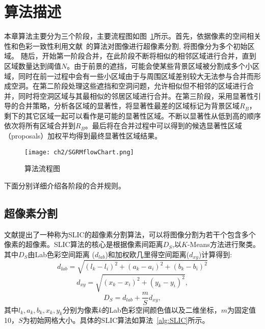 \section{算法描述}
\label{sec:algorithm}
本章算法主要分为三个阶段，主要流程图如图~\ref{fig:algflow}所示。首先，依据像素的空间相关性和色彩一致性利用文献~的算法对图像进行超像素分割, 将图像分为多个初始区域。 随后，开始第一阶段合并，在此阶段不断将相似的相邻区域进行合并，直到区域数量达到阈值$N$。由于前景的遮挡，可能会使某些背景区域被分割成多个小区域，同时在前一过程中会有一些小区域由于与周围区域差别较大无法参与合并而形成空洞。在第二阶段处理这些遮挡和空洞问题，允许相似但不相邻的区域进行合并，同时将空洞区域与其最相似的邻居区域进行合并。在第三阶段，采用显著性引导的合并策略，分析各区域的显著性，将显著性最差的区域标记为背景区域$R_{B}$，剩下的其它区域一起可以看作是可能的显著性区域。不断以显著性从低到高的顺序依次将所有区域合并到$R_{B}$。最后将在合并过程中可以得到的候选显著性区域（proposals）加权平均得到最终显著性区域结果。\par
\begin{figure}[htb]
  \centering%
      {\texttt{[image: ch2/SGRMflowChart.png]}}

  \caption{算法流程图}
  \label{fig:algflow}
\end{figure}

\par
下面分别详细介绍各阶段的合并规则。
\subsection{超像素分割}
\label{ch3:sub:superpixel}
文献提出了一种称为SLIC的超像素分割算法，可以将图像分割为若干个包含多个像素的超像素。SLIC算法的核心是根据像素间距离$D_S$,以$K$-Means方法进行聚类。其中$D_S$由Lab色彩空间距离 ($d_{lab}$)和加权欧几里得空间距离($d_{xy}$)计算得到:
$$ d_{lab}= \sqrt{(l_k-l_i)^2+(a_k-a_i)^2+(b_k-b_i)^2} $$
$$d_{xy}=\sqrt{(x_k-x_i)^2+(y_k-y_i)^2},$$
\begin{equation}
\label{equ:slicDistance}
D_S = d_{lab}+ \frac{m}{S}d_{xy},
\end{equation}
其中$l_k,a_k,b_k,x_k,y_k$分别为像素$k$的Lab色彩空间颜色值以及二维坐标，$m$为固定值10，$S$为初始网格大小。具体的SLIC算法如算法~\ref{alg:SLIC}所示。

